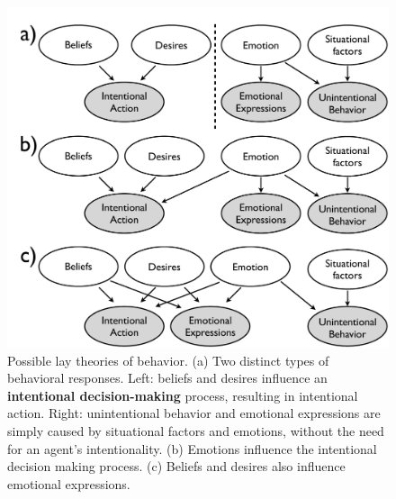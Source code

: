\documentclass[10pt,letterpaper]{article}
\begin{document}




\begin{figure}[htb!]
\begin{center}
\includegraphics[width=1\columnwidth]{images/model1.pdf} 
\end{center}
\caption{ Possible lay theories of behavior. (a) Two distinct types of behavioral responses. Left: beliefs and desires influence an \textbf{intentional decision-making} process, resulting in intentional action. Right: unintentional behavior and emotional expressions are simply caused by situational factors and emotions, without the need for an agent's intentionality. (b) Emotions influence the intentional decision making process. (c) Beliefs and desires also influence emotional expressions. }
\label{ModelsOfBehaviorFig}
\end{figure}
\end{document}

